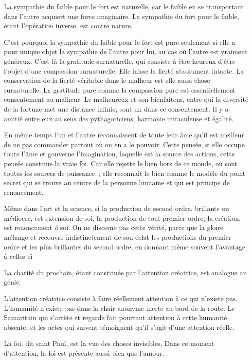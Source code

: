 \documentclass[french,twoside]{book} %
\begin{document}
La sympathie du faible pour le fort est naturelle, car le faible en se transportant dans l'autre acquiert une force imaginaire. La sympathie du fort pour le faible, étant l'opération inverse, est contre nature.\par
C'est pourquoi la sympathie du faible pour le fort est pure seulement si elle a pour unique objet la sympathie de l'autre pour lui, au cas où l'autre est vraiment généreux. C'est là la gratitude surnaturelle, qui consiste à être heureux d'être l'objet d'une compassion surnaturelle. Elle laisse la fierté absolument intacte. La conservation de la fierté véritable dans le malheur est elle aussi chose surnaturelle. La gratitude pure comme la compassion pure est essentiellement consentement au malheur. Le malheureux et son bienfaiteur, entre qui la diversité de la fortune met une distance infinie, sont un dans ce consentement. Il y a amitié entre eux au sens des pythagoriciens, harmonie miraculeuse et égalité.\par
En même temps l'un et l'autre reconnaissent de toute leur âme qu'il est meilleur de ne pas commander partout où on en a le pouvoir. Cette pensée, si elle occupe toute l'âme et gouverne l'imagination, laquelle est la source des actions, cette pensée constitue la vraie foi. Car elle rejette le bien hors de ce monde, où sont toutes les sources de puissance ; elle reconnaît le bien comme le modèle du point secret qui se trouve au centre de la personne humaine et qui est principe de renoncement.\par
Même dans l'art et la science, si la production de second ordre, brillante ou médiocre, est extension de soi, la production de tout premier ordre, la création, est renoncement {\itshape à} soi. On ne discerne pas cette vérité, parce que la gloire mélange et recouvre indistinctement de son éclat les productions du premier ordre et les plus brillantes du second ordre, en donnant même souvent l'avantage à celles-ci\par
La charité du prochain, étant constituée par l'attention créatrice, est analogue au génie.\par
L'attention créatrice consiste à faire réellement attention à ce qui n'existe pas. L'humanité n'existe pas dans la chair anonyme inerte au bord de la route. Le Samaritain qui s'arrête et regarde fait pourtant attention à cette humanité absente, et les actes qui suivent témoignent qu'il s'agit d'une attention réelle.\par
La foi, dit saint Paul, est la vue des choses invisibles. Dans ce moment d'attention, la foi est présente aussi bien que l'amour.\par
\end{document}

